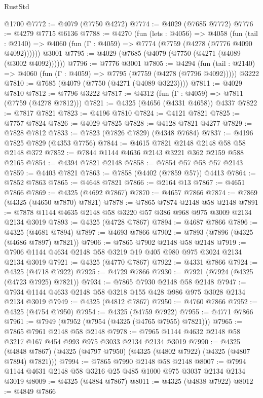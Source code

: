 \begin{lexlean}{RustStd}
\begin{coremodule}
    @1700
@7772 := @4079 (@7750 @4272)
@7774 := @4029 (@7685 @7772)
@7776 := @4279 @7715 @6136
@7788 := @4270
    (fun (lets : @4056) =>
    @4058
      (fun (tail : @2140) => @4060 (fun (Γ : @4059) => @7774 (@7759 (@4278 (@7776 @4090 @4092))))))
    @3001
@7795 := @4029 (@7685 (@4079 (@7750 (@4271 (@4089 (@3002 @4092))))))
@7796 := @7776 @3001
@7805 := @4294
    (fun (tail : @2140) => @4060 (fun (Γ : @4059) => @7795 (@7759 (@4278 (@7796 @4092)))))
    @3222
@7810 := @7685 (@4079 (@7750 (@4271 (@4089 @3223))))
@7811 := @4029 @7810
@7812 := @7796 @3222
@7817 := @4312 (fun (Γ : @4059) => @7811 (@7759 (@4278 @7812)))
@7821 := @4325 (@4656 (@4331 @4658)) @4337
@7822 := @7817 @7821
@7823 := @4196 @7810
@7824 := @4121 @7821
@7825 := @7757 @7824
@7826 := @4029 @7825
@7828 := @4128 @7821 @4277
@7829 := @7828 @7812
@7833 := @7823 (@7826 @7829) (@4348 @7684)
@7837 := @4196 @7825 @7829 (@4353 @7756)
@7844 := @4615 @7821 @2148 @2148 @58 @58 @2148 @372
@7852 := @7844 @1144 @4636 @2143 @3221 @362 @2159 @588 @2165
@7854 := @4394 @7821 @2148
@7858 := @7854 @57 @58 @57 @2143
@7859 := @4403 @7821
@7863 := @7858 (@4402 (@7859 @57)) @4413
@7864 := @7852 @7863
@7865 := @4648 @7821
@7866 := @2164 @13
@7867 := @4651 @7866
@7869 := @4325 (@4692 @7867)
@7870 := @4657 @7866
@7874 := @7869 (@4325 (@4650 @7870) @7821)
@7878 := @7865 @7874 @2148 @58 @2148
@7891 := @7878 @1144 @4635 @2148 @58 @3220 @57 @386 @968 @975 @3009 @2134 @2134 @3019
@7893 := @4325 (@4728 @7867)
@7894 := @4687 @7866
@7896 := @4325 (@4681 @7894)
@7897 := @4693 @7866
@7902 := @7893 (@7896 (@4325 (@4686 @7897) @7821))
@7906 := @7865 @7902 @2148 @58 @2148
@7919 := @7906 @1144 @4634 @2148 @58 @3219 @19 @405 @980 @975 @3024 @2134 @2134 @3019
@7921 := @4325 (@4770 @7867)
@7922 := @4331 @7866
@7924 := @4325 (@4718 @7922)
@7925 := @4729 @7866
@7930 := @7921 (@7924 (@4325 (@4723 @7925) @7821))
@7934 := @7865 @7930 @2148 @58 @2148
@7947 := @7934 @1144 @4633 @2148 @58 @3218 @155 @428 @986 @975 @3028 @2134 @2134 @3019
@7949 := @4325 (@4812 @7867)
@7950 := @4760 @7866
@7952 := @4325 (@4754 @7950)
@7954 := @4325 (@4759 @7922)
@7955 := @4771 @7866
@7961 := @7949 (@7952 (@7954 (@4325 (@4765 @7955) @7821)))
@7965 := @7865 @7961 @2148 @58 @2148
@7978 := @7965 @1144 @4632 @2148 @58 @3217 @167 @454 @993 @975 @3033 @2134 @2134 @3019
@7990 := @4325 (@4848 @7867) (@4325 (@4797 @7950) (@4325 (@4802 @7922) (@4325 (@4807 @7894) @7821)))
@7994 := @7865 @7990 @2148 @58 @2148
@8007 := @7994 @1144 @4631 @2148 @58 @3216 @25 @485 @1000 @975 @3037 @2134 @2134 @3019
@8009 := @4325 (@4884 @7867)
@8011 := @4325 (@4838 @7922)
@8012 := @4849 @7866

\end{coremodule}
\end{lexlean}
